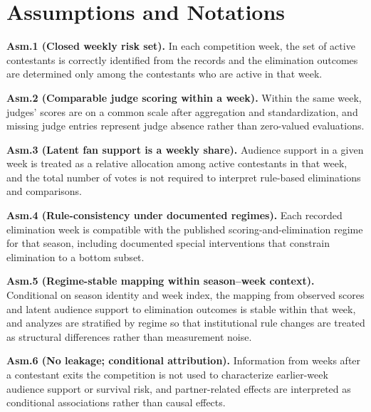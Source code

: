 \section{Assumptions and Notations}

\textbf{Asm.1 (Closed weekly risk set).}
In each competition week, the set of active contestants is correctly identified from the records and the elimination outcomes are determined only among the contestants who are active in that week.

\textbf{Asm.2 (Comparable judge scoring within a week).}
Within the same week, judges’ scores are on a common scale after aggregation and standardization, and missing judge entries represent judge absence rather than zero-valued evaluations.

\textbf{Asm.3 (Latent fan support is a weekly share).}
Audience support in a given week is treated as a relative allocation among active contestants in that week, and the total number of votes is not required to interpret rule-based eliminations and comparisons.

\textbf{Asm.4 (Rule-consistency under documented regimes).}
Each recorded elimination week is compatible with the published scoring-and-elimination regime for that season, including documented special interventions that constrain elimination to a bottom subset.

\textbf{Asm.5 (Regime-stable mapping within season--week context).}
Conditional on season identity and week index, the mapping from observed scores and latent audience support to elimination outcomes is stable within that week, and analyzes are stratified by regime so that institutional rule changes are treated as structural differences rather than measurement noise.

\textbf{Asm.6 (No leakage; conditional attribution).}
Information from weeks after a contestant exits the competition is not used to characterize earlier-week audience support or survival risk, and partner-related effects are interpreted as conditional associations rather than causal effects.





